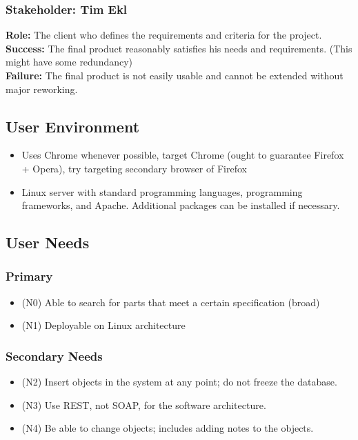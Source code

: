 \documentclass{article}
\begin{document}
\subsubsection{Stakeholder: Tim Ekl}
\textbf{Role:} The client who defines the requirements and criteria for the project.\\
\textbf{Success:} The final product reasonably satisfies his needs and requirements. (This might have some redundancy)\\
\textbf{Failure:} The final product is not easily usable and cannot be extended without major reworking.

\subsection{User Environment}
\begin{itemize}
\item Uses Chrome whenever possible, target Chrome (ought to guarantee Firefox + Opera), try targeting secondary browser of Firefox
\item Linux server with standard programming languages, programming frameworks, and Apache.  Additional packages can be installed if necessary.
\end{itemize}

\subsection{User Needs}
\subsubsection{Primary}
\begin{itemize}
\item (N0) Able to search for parts that meet a certain specification (broad)
\item (N1) Deployable on Linux architecture
\end{itemize}
\subsubsection{Secondary Needs}
\begin{itemize}
\item (N2) Insert objects in the system at any point; do not freeze the database.
\item (N3) Use REST, not SOAP, for the software architecture.
\item (N4) Be able to change objects; includes adding notes to the objects.
\end{itemize}
\end{document}
